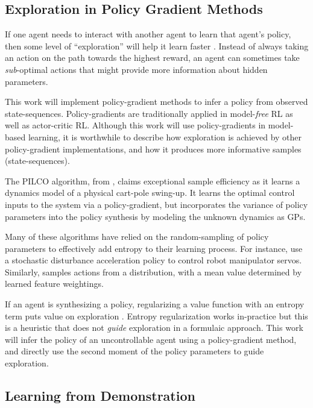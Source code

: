 \subsection{Exploration in Policy Gradient Methods}

    If one agent needs to interact with another agent to learn that agent's policy, then some level of ``exploration''
    will help it learn faster \cite{nachum2017bridging}. Instead of always taking an action on the path towards the
    highest reward, an agent can sometimes take \emph{sub}-optimal actions that might provide more information about
    hidden parameters.

    This work will implement policy-gradient methods to infer a policy from observed state-sequences. Policy-gradients
    \cite{williams1992simple} are traditionally applied in model-\emph{free} \ac{RL} as well as actor-critic \ac{RL}.
    Although this work will use policy-gradients in model-based learning, it is worthwhile to describe how exploration
    is achieved by other policy-gradient implementations, and how it produces more informative samples
    (state-sequences).

    The PILCO algorithm, from \cite{deisenroth2011pilco}, claims exceptional sample efficiency as it learns a dynamics
    model of a physical cart-pole swing-up. It learns the optimal control inputs to the system via a policy-gradient,
    but incorporates the variance of policy parameters into the policy synthesis by modeling the unknown dynamics as
    \acp{GP}.

    Many of these algorithms have relied on the random-sampling of policy parameters to effectively add entropy to their
    learning process. For instance, \cite{peters2008reinforcement} use a stochastic disturbance acceleration policy to
    control robot manipulator servos. Similarly, \cite{sehnke2010parameter} samples actions from a distribution, with a
    mean value determined by learned feature weightings.

    If an agent is synthesizing a policy, regularizing a value function with an entropy term puts value on exploration
    \cite{nachum2017bridging}. Entropy regularization works in-practice but this is a heuristic that does
    not \textit{guide} exploration in a formulaic approach. This work will infer the policy of an uncontrollable agent
    using a policy-gradient method, and directly use the second moment of the policy parameters to guide exploration.


\subsection{Learning from Demonstration}


